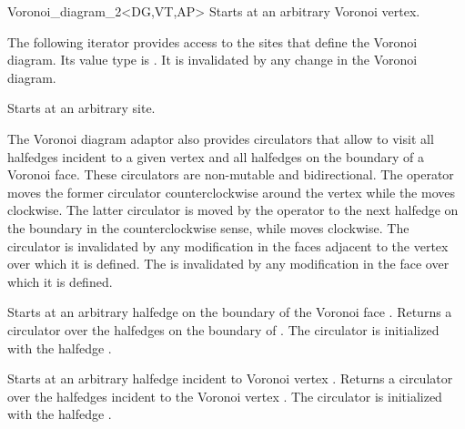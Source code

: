 \begin{ccRefClass}{Voronoi_diagram_2<DG,VT,AP>}
{Starts at an arbitrary Voronoi vertex.}
\ccGlue
{}

The following iterator provides access to the sites that define
the Voronoi diagram. Its value type is . It is
invalidated by any change in the Voronoi diagram.

{Starts at an arbitrary site.}
\ccGlue
{}



The Voronoi diagram adaptor also provides circulators that allow to visit 
all halfedges incident to a given vertex and all halfedges on the
boundary of a Voronoi face. These circulators are non-mutable and
bidirectional.
The operator  moves the former circulator counterclockwise
around the vertex while the  moves clockwise.
The latter circulator is moved by the operator  to the
next halfedge on the boundary in the counterclockwise sense, while
 moves clockwise.
The  circulator is
invalidated by any modification in the faces adjacent to the vertex
over which it is defined. The  is
invalidated by any modification in the face over which it is defined.

\ccThreeToTwo
%
{Starts at an arbitrary halfedge on the boundary of the Voronoi face
  .}
\ccGlue
{} 
{Returns a circulator over the halfedges on the boundary of
  . The circulator is initialized with the halfedge .
  }

\ccThreeToTwo
%
{Starts at an arbitrary halfedge incident to Voronoi vertex .}
\ccGlue
{}
{Returns a circulator over the halfedges incident to the Voronoi
  vertex . The circulator is initialized with the halfedge
  .
  }



\end{ccRefClass}
